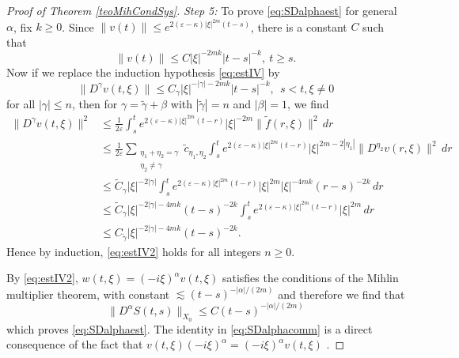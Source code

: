 \documentclass{amsart}
\theoremstyle{plain}
\theoremstyle{remark}
\theoremstyle{plain}
\numberwithin{equation}{section}
\begin{document}
\begin{proof}[Proof of Theorem \ref{teoMihCondSys}]
{\em  Step 5:} To prove \eqref{eq:SDalphaest} for general $\alpha$, fix $k\geq 0$. Since $\|v(t)\| \leq e^{2(\varepsilon-\kappa) |\xi|^{2m} (t-s)}$, there is a constant $C$ such that
\[\|v(t)\| \leq C |\xi|^{-2m k} |t-s|^{-k} , \ t\geq s.\]
Now if we replace the induction hypothesis \eqref{eq:estIV} by
\begin{equation}\label{eq:estIV2}
\|D^{\gamma}v(t,\xi)\|\leq C_{\gamma} |\xi|^{-|\gamma|-2mk} |t-s|^{-k} , \ \ s<t, \xi\neq 0
\end{equation}
for all $|\gamma|\leq n$, then for $\gamma =\tilde{\gamma} + \beta$ with $|\tilde{\gamma}| = n$ and $|\beta|=1$, we find
\begin{align*}
\|D^{\gamma}v(t,\xi)\|^2&\leq \frac{1}{2\varepsilon} \int_s^t e^{2(\varepsilon-\kappa) |\xi|^{2m} (t-r)} |\xi|^{-2m} \|\tilde{f}(r,\xi)\|^2 \, dr
\\ & \leq \frac{1}{2\varepsilon} \sum_{\substack{\eta_{1}+\eta_{2}=\gamma \\ \eta_{2}\neq\gamma}} \tilde{c}_{\eta_1, \eta_2} \int_s^t e^{2(\varepsilon-\kappa) |\xi|^{2m} (t-r)} |\xi|^{2m-2|\eta_1|}  \|D^{\eta_2} v(r,\xi)\|^2 \, dr
\\ & \leq \tilde{C}_{\gamma} |\xi|^{-2|\gamma|}\int_s^t e^{2(\varepsilon-\kappa) |\xi|^{2m} (t-r)} |\xi|^{2m}  |\xi|^{-4mk} (r-s)^{-2k}   \, dr
\\ & \leq \tilde{C}_{\gamma} |\xi|^{-2|\gamma|-4mk} (t-s)^{-2k} \int_s^t e^{2(\varepsilon-\kappa) |\xi|^{2m} (t-r)} |\xi|^{2m}  \, dr
\\ & \leq C_{\tilde{\gamma}} |\xi|^{-2|\gamma|-4mk} (t-s)^{-2k}.
\end{align*}
Hence by induction, \eqref{eq:estIV2} holds for all integers $n\geq 0$.

By \eqref{eq:estIV2}, $w(t,\xi) = (-i\xi)^{\alpha} v(t,\xi)$ satisfies the conditions of the Mihlin multiplier theorem, with constant $\lesssim (t-s)^{-|\alpha|/(2m)}$ and therefore we find that
\[\|D^{\alpha} S(t,s)\|_{X_0}\leq C (t-s)^{-|\alpha|/(2m)}\]
which proves \eqref{eq:SDalphaest}. The identity in \eqref{eq:SDalphacomm} is a direct consequence of the fact that $v(t,\xi) (-i\xi)^{\alpha} =(-i\xi)^{\alpha}v(t,\xi)$ .


\end{proof}
\end{document}
